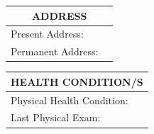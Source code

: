 \documentclass{article}
\begin{document}
\begin{Form}
		\begin{center}
			\begin{tabularx}{\textwidth}{ |lX| }
				\hline
				\multicolumn{2}{|c|}{
					ADDRESS
				}\\
				\hline
				Present Address:&\TextField[name=PresAddr,width=\linewidth]{}\\
				Permanent Address:&\TextField[name=PermAddr,width=\linewidth]{}\\
				\hline
			\end{tabularx}
		\end{center}

		\begin{center}
			\begin{tabularx}{\textwidth}{ | lX | }
				\hline
				\multicolumn{2}{|c|}{
					HEALTH CONDITION/S
				}\\
				\hline
				Physical Health Condition: &\TextField[name=HealthCondition,width=\linewidth]{}\\
				Last Physical Exam: &\TextField[name=LastChkUp,width=\linewidth]{}\\
				\hline
			\end{tabularx}
		\end{center}
		

\end{Form}
\end{document}
